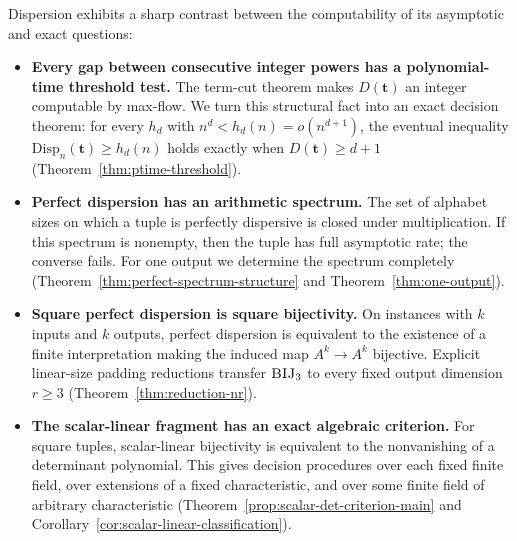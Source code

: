 \documentclass[11pt]{article}
\theoremstyle{definition}
\theoremstyle{plain}
\newcommand{\Disp}{\mathrm{Disp}}
\begin{document}
Dispersion exhibits a sharp contrast between the computability of its asymptotic and exact questions:
\begin{itemize}[leftmargin=*]
\item \textbf{Every gap between consecutive integer powers has a polynomial-time threshold test.}
The term-cut theorem makes $D(\mathbf t)$ an integer computable by max-flow.  We turn this structural fact into
an exact decision theorem: for every $h_d$ with $n^d<h_d(n)=o(n^{d+1})$, the eventual inequality
$\Disp_n(\mathbf t)\ge h_d(n)$ holds exactly when $D(\mathbf t)\ge d+1$
(Theorem~\ref{thm:ptime-threshold}).

\item \textbf{Perfect dispersion has an arithmetic spectrum.}
The set of alphabet sizes on which a tuple is perfectly dispersive is closed under multiplication.  If this
spectrum is nonempty, then the tuple has full asymptotic rate; the converse fails.  For one output we determine
the spectrum completely (Theorem~\ref{thm:perfect-spectrum-structure} and
Theorem~\ref{thm:one-output}).

\item \textbf{Square perfect dispersion is square bijectivity.}
On instances with $k$ inputs and $k$ outputs, perfect dispersion is equivalent to the existence of a finite
interpretation making the induced map $A^k\to A^k$ bijective.  Explicit linear-size padding reductions transfer
$\textsc{BIJ}_3$ to every fixed output dimension $r\ge3$ (Theorem~\ref{thm:reduction-nr}).

\item \textbf{The scalar-linear fragment has an exact algebraic criterion.}
For square tuples, scalar-linear bijectivity is equivalent to the nonvanishing of a determinant polynomial.
This gives decision procedures over each fixed finite field, over extensions of a fixed characteristic, and
over some finite field of arbitrary characteristic (Theorem~\ref{prop:scalar-det-criterion-main} and
Corollary~\ref{cor:scalar-linear-classification}).
\end{itemize}
\end{document}
